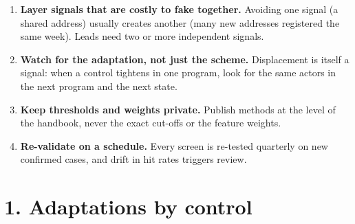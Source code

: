 \documentclass[letterpaper,11pt]{article}
\providecommand{\tightlist}{\setlength{\itemsep}{0pt}\setlength{\parskip}{0pt}}
\begin{document}
\begin{enumerate}
\def\labelenumi{\arabic{enumi}.}
\tightlist
\item
  \textbf{Layer signals that are costly to fake together.} Avoiding one
  signal (a shared address) usually creates another (many new addresses
  registered the same week). Leads need two or more independent signals.
\item
  \textbf{Watch for the adaptation, not just the scheme.} Displacement
  is itself a signal: when a control tightens in one program, look for
  the same actors in the next program and the next state.
\item
  \textbf{Keep thresholds and weights private.} Publish methods at the
  level of the handbook, never the exact cut-offs or the feature
  weights.
\item
  \textbf{Re-validate on a schedule.} Every screen is re-tested
  quarterly on new confirmed cases, and drift in hit rates triggers
  review.
\end{enumerate}

\hypertarget{adaptations-by-control}{%
\section*{1. Adaptations by control}\label{adaptations-by-control}}
\end{document}
